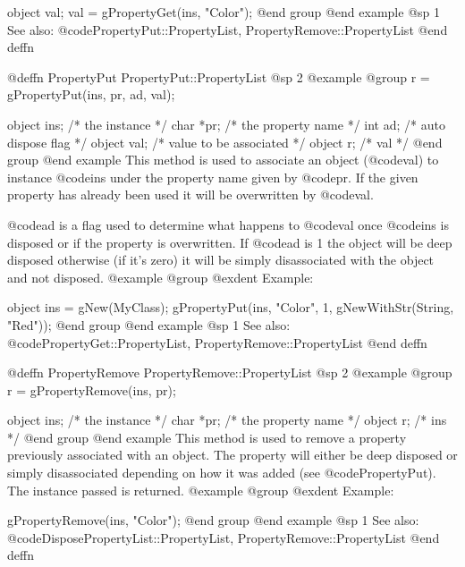object  val;
val = gPropertyGet(ins, "Color"); 
@end group
@end example
@sp 1
See also:  @code{PropertyPut::PropertyList, PropertyRemove::PropertyList}
@end deffn








@deffn {PropertyPut} PropertyPut::PropertyList
@sp 2
@example
@group
r = gPropertyPut(ins, pr, ad, val);

object  ins;   /*  the instance */
char   *pr;    /*  the property name  */
int     ad;    /*  auto dispose flag  */
object  val;   /*  value to be associated  */
object  r;     /*  val  */
@end group
@end example
This method is used to associate an object (@code{val}) to instance
@code{ins} under the property name given by @code{pr}.  If the given
property has already been used it will be overwritten by @code{val}.

@code{ad} is a flag used to determine what happens to @code{val} once
@code{ins} is disposed or if the property is overwritten.  If @code{ad}
is 1 the object will be deep disposed otherwise (if it's zero) it will
be simply disassociated with the object and not disposed.
@example
@group
@exdent Example:

object  ins = gNew(MyClass);
gPropertyPut(ins, "Color", 1, gNewWithStr(String, "Red")); 
@end group
@end example
@sp 1
See also:  @code{PropertyGet::PropertyList, PropertyRemove::PropertyList}
@end deffn






@deffn {PropertyRemove} PropertyRemove::PropertyList
@sp 2
@example
@group
r = gPropertyRemove(ins, pr);

object  ins;   /*  the instance */
char   *pr;    /*  the property name  */
object  r;     /*  ins  */
@end group
@end example
This method is used to remove a property previously associated with an
object.  The property will either be deep disposed or simply disassociated
depending on how it was added (see @code{PropertyPut}).  The instance
passed is returned.
@example
@group
@exdent Example:

gPropertyRemove(ins, "Color"); 
@end group
@end example
@sp 1
See also:  @code{DisposePropertyList::PropertyList, PropertyRemove::PropertyList}
@end deffn






